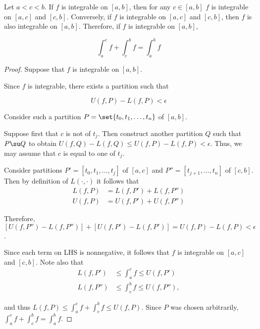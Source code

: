 \documentclass[11pt]{scrartcl}
\begin{document}
\begin{theorem}
  Let $a < c < b$. If $f$ is integrable on $[a, b]$, then for any
  $c\in[a, b]$ $f$ is integrable on $[a,c]$ and $[c, b]$. Conversely,
  if $f$ is integrable on $[a, c]$ and $[c, b]$, then $f$ is also
  integrable on $[a,b]$. Therefore, if $f$ is integrable on $[a,b]$,


  \begin{equation*}
    \int _{a}^{c}f+\int_{c}^{b}f = \int_{a}^{b}f
  \end{equation*}

\end{theorem}

\begin{proof}
  Suppose that $f$ is integrable on $[a,b]$.

  Since $f$ is integrable, there exists a partition such that

  \begin{equation*}
    U(f, P) - L(f, P) < \epsilon
  \end{equation*}

  Consider such a partition $P = \set{t_0, t_1, \dots, t_{n}}$ of
  $[a,b]$.

  Suppose first that $c$ is not of $t_{j}$. Then construct another
  partition $Q$ such that $P\su Q$ to obtain
  $U(f, Q) - L(f, Q) \leq U(f, P) - L(f, P) < \epsilon$. Thus, we may assume
  that $c$ is equal to one of $t_{j}$.

  Consider partitions $P' = [t_0, t_1, \dots, t_j]$ of $[a,c]$ and
  $P'' = [t_{j+1}, \dots, t_n]$ of $[c,b]$. Then by definition of
  $L(\cdot, \cdot)$ it follows that
  \begin{align}
    L(f, P) &= L(f, P') + L(f, P'')\\
    U(f, P) &= U(f, P') + U(f, P'')
  \end{align}

  Therefore,
  $[U(f, P'')-L(f, P'')] + [U(f, P') - L(f, P')] = U(f, P) - L(f, P) <
  \epsilon$.

  Since each term on LHS is nonnegative, it follows that $f$ is
  integrable on $[a, c]$ and $[c, b]$. Note also that
  \begin{align}
    L(f, P') &\leq \int_{a}^{c}f \leq U(f, P')\\
    L(f, P'') &\leq \int_c^bf \leq U(f, P''),
  \end{align}

  and thus $L(f, P) \leq \int_a^cf + \int_c^bf\leq U(f, P)$. Since $P$ was
  chosen arbitrarily, $\int_a^cf + \int_c^bf = \int_a^bf$.


\end{proof}
\end{document}
